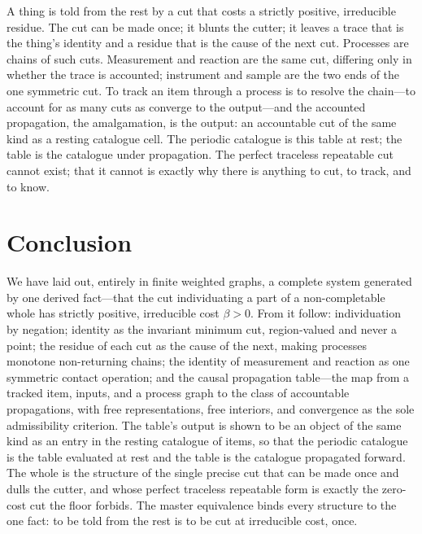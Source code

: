 \documentclass[11pt,a4paper]{article}
\theoremstyle{thmstyle}
\theoremstyle{definition}
\theoremstyle{remark}
\newcommand{\flo}{\beta}                 %
\begin{document}
A thing is told from the rest by a cut that costs a strictly positive,
irreducible residue. The cut can be made once; it blunts the cutter; it
leaves a trace that is the thing's identity and a residue that is the cause
of the next cut. Processes are chains of such cuts. Measurement and
reaction are the same cut, differing only in whether the trace is
accounted; instrument and sample are the two ends of the one symmetric cut.
To track an item through a process is to resolve the chain---to account for
as many cuts as converge to the output---and the accounted propagation, the
amalgamation, is the output: an accountable cut of the same kind as a
resting catalogue cell. The periodic catalogue is this table at rest; the
table is the catalogue under propagation. The perfect traceless repeatable
cut cannot exist; that it cannot is exactly why there is anything to cut,
to track, and to know.

\section{Conclusion}
\label{sec:conclusion}

We have laid out, entirely in finite weighted graphs, a complete system
generated by one derived fact---that the cut individuating a part of a
non-completable whole has strictly positive, irreducible cost $\flo>0$.
From it follow: individuation by negation; identity as the invariant
minimum cut, region-valued and never a point; the residue of each cut as
the cause of the next, making processes monotone non-returning chains; the
identity of measurement and reaction as one symmetric contact operation;
and the causal propagation table---the map from a tracked item, inputs, and
a process graph to the class of accountable propagations, with free
representations, free interiors, and convergence as the sole admissibility
criterion. The table's output is shown to be an object of the same kind as
an entry in the resting catalogue of items, so that the periodic catalogue
is the table evaluated at rest and the table is the catalogue propagated
forward. The whole is the structure of the single precise cut that can be
made once and dulls the cutter, and whose perfect traceless repeatable form
is exactly the zero-cost cut the floor forbids. The master equivalence
binds every structure to the one fact: to be told from the rest is to be
cut at irreducible cost, once.



\end{document}
